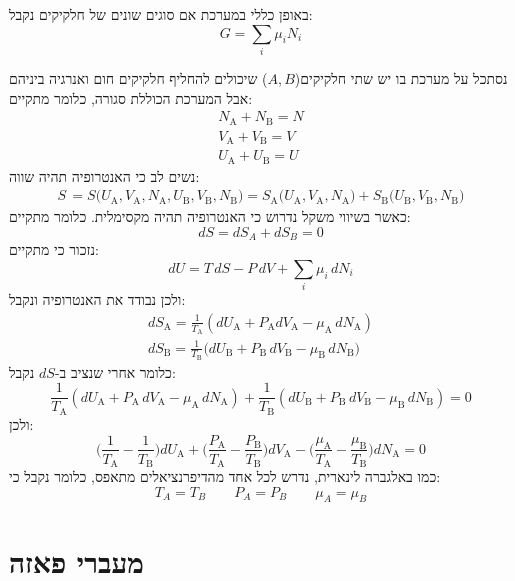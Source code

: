 \documentclass{tstextbook}
\begin{document}
\begin{corollary}
באופן כללי במערכת אם סוגים שונים של חלקיקים נקבל:
$$G=\sum_{i}\mu_{i}N_{i}$$

\end{corollary}
\begin{example}
נסתכל על מערכת בו יש שתי חלקיקים(\(A,B\)) שיכולים להחליף חלקיקים חום ואנרגיה ביניהם אבל המערכת הכוללת סגורה, כלומר מתקיים:
\begin{gather*}N_{\mathrm{A}}+N_{\mathrm{B}}=N \\V_{\mathrm{{A}}}+V_{\mathrm{{B}}}=V \\U_{\mathrm{{A}}}+U_{\mathrm{{B}}}=U
\end{gather*}
נשים לב כי האנטרופיה תהיה שווה:
\begin{gather*}{S\,=S\bigl(U_{\mathrm{A}},V_{\mathrm{A}},N_{\mathrm{A}},U_{\mathrm{B}},V_{\mathrm{B}},N_{\mathrm{B}}\bigr)}{=S_{\mathrm{A}}\bigl(U_{\mathrm{A}},V_{\mathrm{A}},N_{\mathrm{A}}\bigr)\!+\!S_{\mathrm{B}}\bigl(U_{\mathrm{B}},V_{\mathrm{B}},N_{\mathrm{B}}\bigr)}\end{gather*}
כאשר בשיווי משקל נדרוש כי האנטרופיה תהיה מקסימלית. כלומר מתקיים:
$$dS=dS_{A}+dS_{B}=0$$
נזכור כי מתקיים:
$$d U=T\,d S-P\,d V+\sum_{i}\mu_{i}\,d N_{i}$$
ולכן נבודד את האנטרופיה ונקבל:
\begin{gather*}d S_{\mathrm{A}}={\frac{1}{T_{\mathrm{A}}}}(d U_{\mathrm{A}}+P_{\mathrm{A}}d V_{\mathrm{A}}-\mu_{\mathrm{A}}\,d N_{\mathrm{A}})  \\  d S_{\mathrm{B}}={\frac{1}{T_{\mathrm{B}}}}\big(d U_{\mathrm{B}}+P_{\mathrm{B}}\,d V_{\mathrm{B}}-\mu_{\mathrm{B}}\,d N_{\mathrm{B}}\big) 
\end{gather*}
כלומר אחרי שנציב ב-\(dS\) נקבל:
$${\frac{1}{T_{\mathrm{A}}}}(d U_{\mathrm{A}}+P_{\mathrm{A}}\,d V_{\mathrm{A}}-\mu_{\mathrm{A}}\,d N_{\mathrm{A}})+{\frac{1}{T_{\mathrm{B}}}}(d U_{\mathrm{B}}+P_{\mathrm{B}}\,d V_{\mathrm{B}}-\mu_{\mathrm{B}}\,d N_{\mathrm{B}})=0$$
ולכן:
$$\Biggl({\frac{1}{T_{\mathrm{A}}}}-{\frac{1}{T_{\mathrm{B}}}}\Biggr)d U_{\mathrm{A}}+\Biggl({\frac{P_{\mathrm{A}}}{T_{\mathrm{A}}}}-{\frac{P_{\mathrm{B}}}{T_{\mathrm{B}}}}\Biggr)d V_{\mathrm{A}}-\Biggl({\frac{\mu_{\mathrm{A}}}{T_{\mathrm{A}}}}-{\frac{\mu_{\mathrm{B}}}{T_{\mathrm{B}}}}\Biggr)d N_{\mathrm{A}}=0$$
כמו באלגברה לינארית, נדרש לכל אחד מהדיפרנציאלים מתאפס, כלומר נקבל כי:
$$T_{A}=T_{B}\qquad P_{A}=P_{B}\qquad \mu_{A}=\mu_{B}$$

\end{example}
\section{מעברי פאזה}
\end{document}
